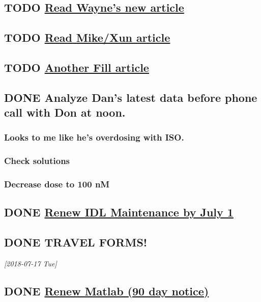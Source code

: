 \documentclass[11pt]{article}
\begin{document}
\subsection{{\bfseries\sffamily TODO} \href{//\%3c20180124110537.49E71604D8E7@pmdist301.st-va.ncbi.nlm.nih.gov\%3E}{Read Wayne's new article}}
\label{sec:org34b184b}
\subsection{{\bfseries\sffamily TODO} \href{//\%3c20180124110952.02870604D8E6@pmdist301.st-va.ncbi.nlm.nih.gov\%3E}{Read Mike/Xun article}}
\label{sec:orgefe62f8}
\subsection{{\bfseries\sffamily TODO} \href{//\%3c20180125111327.E50D720155E0@esupp01.be-md.ncbi.nlm.nih.gov\%3E}{Another Fill article}}
\label{sec:orga91cf54}
\subsection{{\bfseries\sffamily DONE} Analyze Dan's latest data before phone call with Don at noon.}
\label{sec:orgb597721}
\subsubsection{Looks to me like he's overdosing with ISO.}
\label{sec:orgae6ba3b}
\subsubsection{Check solutions}
\label{sec:orgca2e53b}
\subsubsection{Decrease dose to 100 nM}
\label{sec:org65ef44e}
\subsection{{\bfseries\sffamily DONE} \href{//\%3cd86b20f74b8f4abbad2a713cd91e9e31@MLBXCH15.cs.myharris.net\%3E}{Renew IDL Maintenance by July 1}}
\label{sec:orgb168438}
\subsection{{\bfseries\sffamily DONE} TRAVEL FORMS!}
\label{sec:org28bde74}
\textit{[2018-07-17 Tue]}
\subsection{{\bfseries\sffamily DONE} \href{//\%3c959be2bf71a443ac9bbfb5eac56f4fd8@646005169\%3E}{Renew Matlab (90 day notice)}}
\label{sec:orgb0f1385}
\end{document}
